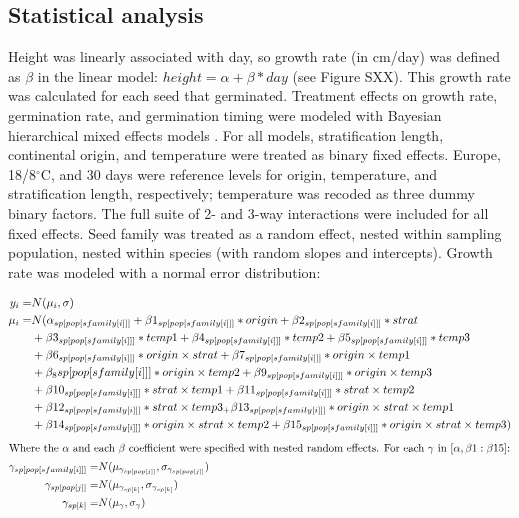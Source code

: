 \documentclass[12pt]{article}\usepackage[]{graphicx}\usepackage[]{color}
\begin{document}
	\subsection{Statistical analysis}
	Height was linearly associated with day, so growth rate (in cm/day) was defined as $\beta$ in the linear model: $height = \alpha + \beta*day $ (see Figure SXX). This growth rate was calculated for each seed that germinated. Treatment effects on growth rate, germination rate, and germination timing were modeled with Bayesian hierarchical mixed effects models \parencite{Gelman2004}. For all models, stratification length, continental origin, and temperature were treated as binary fixed effects. Europe, 18/8$^\circ$C, and 30 days were reference levels for origin, temperature, and stratification length, respectively; temperature was recoded as three dummy binary factors. The full suite of 2- and 3-way interactions were included for all fixed effects. Seed family was treated as a random effect, nested within sampling population, nested within species (with random slopes and intercepts). Growth rate was modeled with a normal error distribution: 

\begin{align}
y_i =&  N(\mu_i,\sigma)\\
  \mu_i =&  N(\alpha_{sp[pop[sfamily[i]]]} + \beta 1_{sp[pop[sfamily[i]]]}*origin +  \beta 2_{sp[pop[sfamily[i]]]} * strat\\
          & +\beta 3_{sp[pop[sfamily[i]]]}*temp1 +  \beta 4_{sp[pop[sfamily[i]]]}*temp2 + \beta 5_{sp[pop[sfamily[i]]]}*temp3 \notag \\
          & 
 		 + \beta 6_{sp[pop[sfamily[i]]]}*origin\times strat  + \beta 7_{sp[pop[sfamily[i]]]}*origin \times temp1 \notag\\ &
 		 + \beta_8{sp[pop[sfamily[i]]]}*origin \times temp2 + \beta 9_{sp[pop[sfamily[i]]]}*origin \times temp3 \notag \\ &
 		 +\beta 10_{sp[pop[sfamily[i]]]}*strat\times temp1 +\beta 11_{sp[pop[sfamily[i]]]}*strat \times temp2 \notag \\ &
 		 + \beta 12_{sp[pop[sfamily[i]]]}*strat \times temp3_ + \beta 13_{sp[pop[sfamily[i]]]}*origin \times strat \times temp1 \notag\\ &
 		 +\beta 14_{sp[pop[sfamily[i]]]}*origin \times strat \times temp2 + \beta 15_{sp[pop[sfamily[i]]]}*origin \times strat \times temp3 )\notag
 \end{align}
 \begin{align}
 		 \intertext{Where the $\alpha$ and each $\beta$ coefficient were specified with nested random effects. For each $\gamma$ in $[\alpha,\beta 1:\beta 15]$:}
 		 \gamma_{sp[pop[sfamily[i]]]} =& N(\mu_{\gamma_{sp[pop[j]]}}, \sigma_{\gamma_{sp[pop[j]]}}) \\
 		 \gamma_{sp[pop[j]]} = & N(\mu_{\gamma_{sp[k]}}, \sigma_{\gamma_{sp[k]}}) \\
 		 \gamma_{sp[k]} = & N(\mu_{\gamma}, \sigma_{\gamma})
\end{align}
\end{document}
